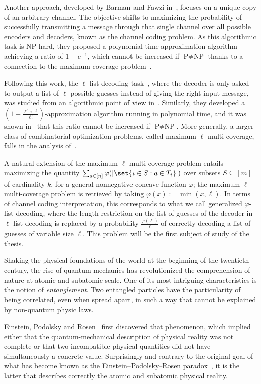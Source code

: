 Another approach, developed by Barman and Fawzi in~\cite{BF18}, focuses on a unique copy of an arbitrary channel. The objective shifts to maximizing the probability of successfully transmitting a message through that single channel over all possible encoders and decoders, known as the channel coding problem. As this algorithmic task is \textrm{NP}-hard, they proposed a polynomial-time approximation algorithm achieving a ratio of $1-e^{-1}$, which cannot be increased if $\textrm{P}\not=\textrm{NP}$ thanks to a connection to the maximum coverage problem~\cite{Feige02}.

Following this work, the $\ell$-list-decoding task~\cite{Elias57,Wozencraft58}, where the decoder is only asked to output a list of $\ell$ possible guesses instead of giving the right input message, was studied from an algorithmic point of view in~\cite{BFGG20}. Similarly, they developed a $\left(1-\frac{\ell^{\ell}e^{-\ell}}{\ell!}\right)$-approximation algorithm running in polynomial time, and it was shown in~\cite{DMMS20} that this ratio cannot be increased if $\textrm{P}\not=\textrm{NP}$. More generally, a larger class of combinatorial optimization problems, called maximum $\ell$-multi-coverage, falls in the analysis of~\cite{BFGG20}.

A natural extension of the maximum $\ell$-multi-coverage problem entails maximizing the quantity $\sum_{a \in [n]}  \varphi(\abs{\set{i \in S : a \in T_i}})$ over subsets $S \subseteq [m]$ of cardinality $k$, for a general nonnegative concave function $\varphi$; the  maximum $\ell$-multi-coverage problem is retrieved by taking $\varphi(x) := \min(x,\ell)$. In terms of channel coding interpretation, this corresponds to what we call generalized $\varphi$-list-decoding, where the length restriction on the list of guesses of the decoder in $\ell$-list-decoding is replaced by a probability $\frac{\varphi(\ell)}{\ell}$ of correctly decoding a list of guesses of variable size $\ell$. This problem will be the first subject of study of the thesis.

Shaking the physical foundations of the world at the beginning of the twentieth century, the rise of quantum mechanics has revolutionized the comprehension of nature at atomic and subatomic scale. One of its most intriguing characteristics is the notion of \emph{entanglement}. Two entangled particles have the particularity of being correlated, even when spread apart, in such a way that cannot be explained by non-quantum physic laws.

Einstein, Podolsky and Rosen~\cite{EPR35} first discovered that phenomenon, which implied either that the quantum-mechanical description of physical reality was not complete or that two incompatible physical quantities did not have simultaneously a concrete value. Surprisingly and contrary to the original goal of what has become known as the Einstein–Podolsky–Rosen paradox~\cite{EPR35}, it is the latter that describes correctly the atomic and subatomic physical reality.


